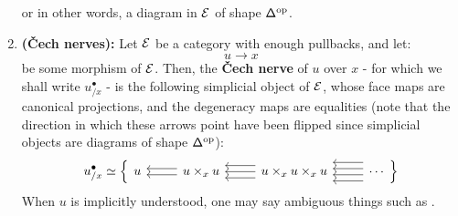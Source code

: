 \begin{definition}
\begin{enumerate}
                        or in other words, a diagram in $\mathcal{E}$ of shape $\mathsf{\Delta}^{\mathrm{op}}$. 
                        \item \textbf{(\v{C}ech nerves):} Let $\mathcal{E}$ be a category with enough pullbacks, and let:
                            $$u \to x$$
                        be some morphism of $\mathcal{E}$. Then, the \textbf{\v{C}ech nerve} of $u$ over $x$ - for which we shall write $u^{\bullet}_{/x}$ - is the following simplicial object of $\mathcal{E}$, whose face maps are canonical projections, and the degeneracy maps are equalities (note that the direction in which these arrows point have been flipped since simplicial objects are diagrams of shape $\mathsf{\Delta}^{\mathrm{op}}$):
                            $$u^{\bullet}_{/x} \cong
                                \left\{
                                    \begin{tikzcd}
                                    	u & {u \x_x u} & {u \x_x u \x_x u} & \cdots
                                    	\arrow[shift right=1, from=1-2, to=1-1]
                                    	\arrow[shift left=1, from=1-2, to=1-1]
                                    	\arrow[from=1-3, to=1-2]
                                    	\arrow[shift right=2, from=1-3, to=1-2]
                                    	\arrow[shift left=2, from=1-3, to=1-2]
                                    	\arrow[shift left=1, from=1-4, to=1-3]
                                    	\arrow[shift right=1, from=1-4, to=1-3]
                                    	\arrow[shift left=3, from=1-4, to=1-3]
                                    	\arrow[shift right=3, from=1-4, to=1-3]
                                    \end{tikzcd}
                                \right\}
                            $$
                        When $u$ is implicitly understood, one may say ambiguous things such as .
                        

\end{enumerate}
\end{definition}
